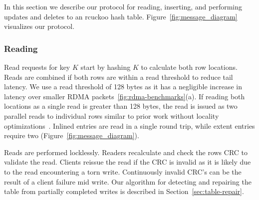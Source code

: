 In this section we describe our protocol for reading,
inserting, and performing updates and deletes to an rcuckoo
hash table. Figure~\ref{fig:message_diagram} visualizes our
protocol.

\subsubsection{Reading} 
\label{sec:reading}

Read requests for key $K$ start by hashing $K$ to calculate
both row locations. Reads are combined if both rows are
within a read threshold to reduce tail latency. We use a
read threshold of 128 bytes as it has a negligible increase
in latency over smaller RDMA
packets~\ref{fig:rdma-benchmarks}(a). If reading both
locations as a single read is greater than 128 bytes, the
read is issued as two parallel reads to individual rows
similar to prior work without locality
optimizations~\cite{pilaf, race}. Inlined entries are read
in a single round trip, while extent entries require two
(Figure~\ref{fig:message_diagram}).

Reads are performed locklessly. Readers recalculate and
check the rows CRC to validate the read. Clients reissue the
read if the CRC is invalid as it is likely due to the read
encountering a torn write. Continuously invalid CRC's can be
the result of a client failure mid write. Our algorithm for
detecting and repairing the table from partially completed
writes is described in Section~\ref{sec:table-repair}.


